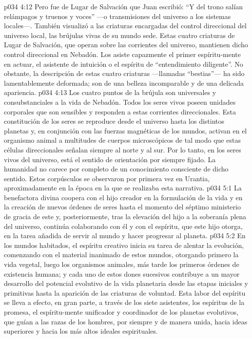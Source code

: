 \vs p034 4:12 Pero fue de Lugar de Salvación que Juan escribió: “Y del trono salían relámpagos y truenos y voces” ---o transmisiones del universo a los sistemas locales---. También visualizó a las criaturas encargadas del control direccional del universo local, las brújulas vivas de su mundo sede. Estas cuatro criaturas de Lugar de Salvación, que operan sobre las corrientes del universo, mantienen dicho control direccional en Nebadón. Los asiste capazmente el primer espíritu\hyp{}mente en actuar, el asistente de intuición o el espíritu de “entendimiento diligente”. No obstante, la descripción de estas cuatro criaturas ---llamadas “bestias”--- ha sido lamentablemente deformada; son de una belleza incomparable y de una delicada apariencia.
\vs p034 4:13 Los cuatro puntos de la brújula son universales y consubstanciales a la vida de Nebadón. Todos los seres vivos poseen unidades corporales que son sensibles y responden a estas corrientes direccionales. Esta constitución de los seres se reproduce desde el universo hasta los distintos planetas y, en conjunción con las fuerzas magnéticas de los mundos, activan en el organismo animal a multitudes de cuerpos microscópicos de tal modo que estas células direccionales señalan siempre al norte y al sur. Por lo tanto, en los seres vivos del universo, está el sentido de orientación por siempre fijado. La humanidad no carece por completo de un conocimiento consciente de dicho sentido. Estos corpúsculos se observaron por primera vez en Urantia, aproximadamente en la época en la que se realizaba esta narrativa.
\vs p034 5:1 La benefactora divina coopera con el hijo creador en la formulación de la vida y en la creación de nuevos órdenes de seres hasta el momento del séptimo ministerio de gracia de este y, posteriormente, tras la elevación del hijo a la soberanía plena del universo, continúa colaborando con él y con el espíritu, que este hijo otorga, en la tarea añadida de servir al mundo y hacer progresar al planeta.
\vs p034 5:2 En los mundos habitados, el espíritu creativo inicia su tarea de alentar la evolución, comenzando con el material inanimado de estos mundos, otorgando primero la vida vegetal, luego los organismos animales, más tarde los primeros órdenes de existencia humana; y cada uno de estos dones sucesivos contribuye a un mayor desarrollo del potencial evolutivo de la vida planetaria desde las etapas iniciales y primitivas hasta la aparición de las criaturas de voluntad. Esta labor del espíritu se lleva a efecto, en gran parte, a través de los siete asistentes, los espíritus de la promesa, el espíritu\hyp{}mente unificador y coordinador de los planetas evolutivos, que guían a las razas de los hombres, por siempre y de manera unida, hacia ideas superiores y hacia los más altos ideales espirituales.
